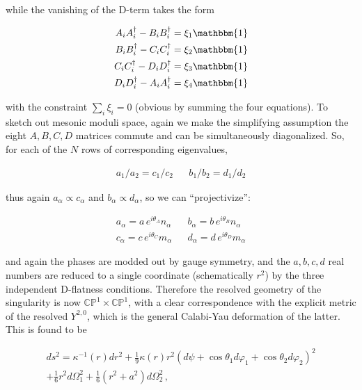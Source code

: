 while the vanishing of the D-term takes the form

\begin{align}
	\begin{split}
		A_i A^\dagger_i - B_i B^\dagger_i = \xi_1 \mathbbm{1} \\
		B_i B^\dagger_i - C_i C^\dagger_i = \xi_2 \mathbbm{1} \\
		C_i C^\dagger_i - D_i D^\dagger_i = \xi_3 \mathbbm{1} \\
		D_i D^\dagger_i - A_i A^\dagger_i = \xi_4 \mathbbm{1}
	\end{split}
	\label{}
\end{align}

with the constraint $\sum_i \xi_i = 0$ (obvious by summing the four equations). To sketch out mesonic moduli space, again we make the simplifying assumption the eight $A, B, C, D$ matrices commute and can be simultaneously diagonalized. So, for each of the $N$ rows of corresponding eigenvalues,

\begin{align}
	a_1/a_2 = c_1/c_2 && b_1/b_2 = d_1 / d_2
	\label{}
\end{align}

thus again $a_\alpha \propto c_\alpha$ and $b_\alpha \propto d_\alpha$, so we can ``projectivize'':

\begin{align}
		a_\alpha = a \, e^{i\theta_A} n_\alpha && b_\alpha = b \, e^{i\theta_B} n_\alpha \\
		c_\alpha = c \, e^{i\theta_C} m_\alpha && d_\alpha = d \, e^{i\theta_D} m_\alpha 
\end{align}

and again the phases are modded out by gauge symmetry, and the $a, b, c, d$ real numbers are reduced to a single coordinate (schematically $r^2$) by the three independent D-flatness conditions. Therefore the resolved geometry of the singularity is now $\mathbb{CP}^1 \times \mathbb{CP}^1$, with a clear correspondence with the explicit metric of the resolved $Y^{2,0}$, which is the general Calabi-Yau deformation of the latter. This is found to be\cite{copycit}

\begin{equation}
	\begin{split}
	ds^2 = \kappa^{-1}(r) dr^2 + \frac{1}{9} \kappa(r) r^2 \left( d\psi + \cos\theta_1 d\varphi_1 + \cos\theta_2 d\varphi_2 \right)^2 \\
	+ \frac{1}{6} r^2 d\Omega_1^2 + \frac{1}{6}(r^2 + a^2) d\Omega_2^2\,,
	\label{}
\end{split}
\end{equation}

